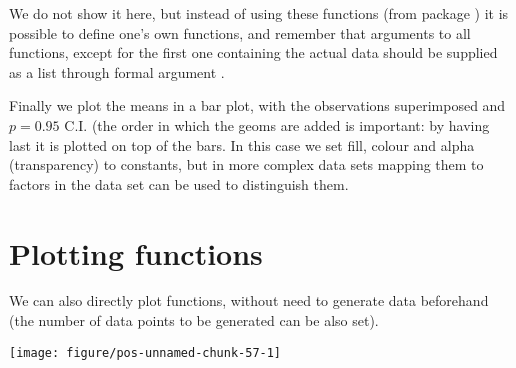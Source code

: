 \documentclass[paper=a4,headsepline,BCOR=12mm,twoside,open=right,%
titlepage,headings=small,fontsize=10pt,index=totoc,bibliography=totoc,%
captions=tableheading,captions=nooneline]{scrbook}\usepackage{knitr}
\begin{document}
We do not show it here, but instead of using these functions (from package \Hmisc) it is possible to define one's own functions, and remember that arguments to all functions, except for the first one containing the actual data should be supplied as a list through formal argument .

Finally we plot the means in a bar plot, with the observations superimposed and $p = 0.95$ C.I. (the order in which the geoms are added is important: by having  last it is plotted on top of the bars. In this case we set fill, colour and alpha (transparency) to constants, but in more complex data sets mapping
them to factors in the data set can be used to distinguish them.

\begin{knitrout}\footnotesize
{}\color{fgcolor}\begin{kframe}
\begin{alltt}
\hlstd{(} \hlstd{(}  \hlopt{+}
  \hlstd{(} \hlstd{=} \hlstd{,}  \hlstd{=} \hlstd{,}
               \hlstd{=}\hlstd{,} \hlstd{=}\hlstd{)} \hlopt{+}
  \hlstd{(} \hlstd{=} \hlstd{,}
                \hlstd{=} \hlstd{,}  \hlstd{=} \hlstd{,}
               \hlstd{=}\hlstd{,} \hlstd{=}\hlstd{,} \hlstd{=}\hlstd{)} \hlopt{+}
  \hlstd{(}\hlstd{=}\hlstd{,} \hlstd{=}\hlstd{)}
\end{alltt}
\end{kframe}
\end{knitrout}

\section{Plotting functions}

We can also directly plot functions, without need to generate data beforehand (the number of data points to be generated can be also set).

\begin{knitrout}\footnotesize
{}\color{fgcolor}\begin{kframe}
\begin{alltt}
\hlstd{(}\hlstd{(}\hlstd{=}\hlopt{-}\hlopt{:}\hlstd{),} \hlstd{(} \hlopt{+}
  \hlstd{(}
\end{alltt}
\end{kframe}

{\centering \texttt{[image: figure/pos-unnamed-chunk-57-1]} 

}



\end{knitrout}
\end{document}

